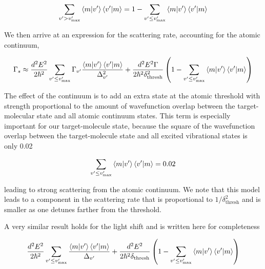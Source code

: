 \documentclass[aps,secnumarabic,amsmath,amssymb,superscriptaddress]{revtex4}
\begin{document}
\begin{equation}
  \displaystyle\sum_{v' > v'_{\text{max}}}\braket{m|v'}\braket{v'|m} = 1 - \displaystyle\sum_{v' \leq v'_{\text{max}}}\braket{m|v'}\braket{v'|m}
\end{equation}

We then arrive at an expression for the scattering rate, accounting for the atomic continuum,

\begin{equation}
  \Gamma_s \approx \frac{d^2E^2}{2\hbar^2}\displaystyle\sum_{v' \leq v'_{\text{max}}}\Gamma_{v'} \frac{\braket{m|v'}\braket{v'|m}}{\Delta_{v'}^2} +  \frac{d^2E^2\Gamma}{2\hbar^2\delta_{\text{thresh}}^2}\left(1 - \displaystyle\sum_{v' \leq v'_{\text{max}}}\braket{m|v'}\braket{v'|m}\right)
\end{equation}

The effect of the continuum is to add an extra state at the atomic threshold with strength proportional to the amount of wavefunction overlap between the target-molecular state and all atomic continuum states. This term is especially important for our target-molecule state, because the square of the wavefunction overlap between the target-molecule state and all excited vibrational states is only 0.02

\begin{equation}
  \displaystyle\sum_{v' \leq v'_{\text{max}}}\braket{m|v'}\braket{v'|m} = 0.02
\end{equation}

leading to strong scattering from the atomic continuum. We note that this model leads to a component in the scattering rate that is proportional to $ 1/\delta_{\text{thresh}}^2$ and is smaller as one detunes farther from the threshold.

A very similar result holds for the light shift and is written here for completeness

\begin{equation}
  \frac{d^2E^2}{2\hbar^2}\displaystyle\sum_{v' \leq v'_{\text{max}}} \frac{\braket{m|v'}\braket{v'|m}}{\Delta_{v'}} +  \frac{d^2E^2}{2\hbar^2\delta_{\text{thresh}}}\left(1 - \displaystyle\sum_{v' \leq v'_{\text{max}}}\braket{m|v'}\braket{v'|m}\right)
\end{equation}
\end{document}

